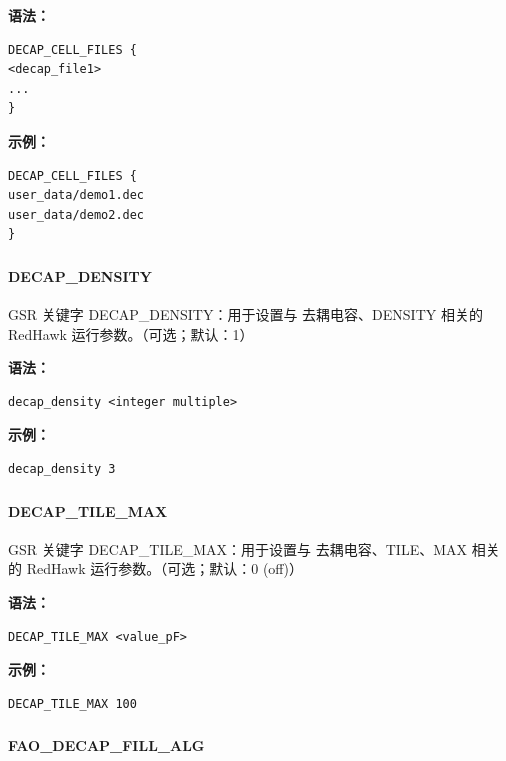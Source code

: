 \textbf{语法：}
\begin{lstlisting}
DECAP_CELL_FILES {
<decap_file1>
...
}
\end{lstlisting}

\textbf{示例：}
\begin{lstlisting}
DECAP_CELL_FILES {
user_data/demo1.dec
user_data/demo2.dec
}
\end{lstlisting}

\subsubsection{}
\paragraph*{DECAP_DENSITY}

GSR 关键字 DECAP_DENSITY：用于设置与 去耦电容、DENSITY 相关的 RedHawk 运行参数。（可选；默认：1）

\textbf{语法：}
\begin{lstlisting}
decap_density <integer multiple>
\end{lstlisting}

\textbf{示例：}
\begin{lstlisting}
decap_density 3
\end{lstlisting}

\subsubsection{}
\paragraph*{DECAP_TILE_MAX}

GSR 关键字 DECAP_TILE_MAX：用于设置与 去耦电容、TILE、MAX 相关的 RedHawk 运行参数。（可选；默认：0 (off)）

\textbf{语法：}
\begin{lstlisting}
DECAP_TILE_MAX <value_pF>
\end{lstlisting}

\textbf{示例：}
\begin{lstlisting}
DECAP_TILE_MAX 100
\end{lstlisting}

\subsubsection{}
\paragraph*{FAO_DECAP_FILL_ALG}


